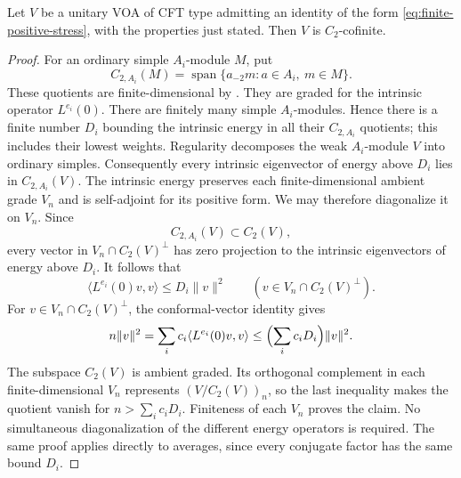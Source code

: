 \begin{lemma}\label{lem:positive-c2}
Let $V$ be a unitary VOA of CFT type admitting an identity of the form
\eqref{eq:finite-positive-stress}, with the properties just stated.
Then $V$ is $C_2$-cofinite.
\end{lemma}
\begin{proof}
For an ordinary simple $A_i$-module $M$, put
\[
 C_{2,A_i}(M)=\operatorname{span}\{a_{-2}m:a\in A_i,\ m\in M\}.
\]
These quotients are finite-dimensional by \cite[Proposition~5.2]{ABD}.
They are graded for the intrinsic operator $L^{e_i}(0)$.
There are finitely many simple $A_i$-modules. Hence
there is a finite number $D_i$ bounding the intrinsic energy in all
their $C_{2,A_i}$ quotients; this includes their lowest weights.
Regularity decomposes the weak $A_i$-module $V$ into ordinary simples.
Consequently every intrinsic eigenvector of energy above $D_i$ lies
in $C_{2,A_i}(V)$. The intrinsic energy preserves each finite-dimensional
ambient grade $V_n$ and is self-adjoint for its positive form. We may
therefore diagonalize it on $V_n$. Since
\[
 C_{2,A_i}(V)\subset C_2(V),
\]
every vector in $V_n\cap C_2(V)^\perp$ has zero projection to the
intrinsic eigenvectors of energy above $D_i$. It follows that
\[
 \langle L^{e_i}(0)v,v\rangle\le D_i\|v\|^2
 \qquad (v\in V_n\cap C_2(V)^\perp).
\]
For $v\in V_n\cap C_2(V)^\perp$, the conformal-vector identity gives
\[
 n\|v\|^2
 =\sum_i c_i\langle L^{e_i}(0)v,v\rangle
 \le\Bigl(\sum_i c_iD_i\Bigr)\|v\|^2.
\]
The subspace $C_2(V)$ is ambient graded. Its orthogonal complement in
each finite-dimensional $V_n$ represents $(V/C_2(V))_n$, so the last
inequality makes the quotient vanish for
$n>\sum_i c_iD_i$. Finiteness of each $V_n$ proves the claim.
No simultaneous diagonalization of the different energy operators is
required. The same proof applies directly to averages, since every
conjugate factor has the same bound $D_i$.
\end{proof}

